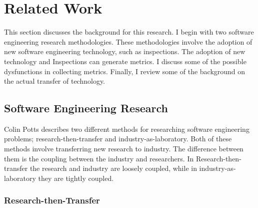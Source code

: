 \newpage
\section{Related Work}
\label{sec:related}

This section discusses the background for this research.  I begin with two
software engineering research methodologies.  These methodologies involve
the adoption of new software engineering technology, such as inspections.
The adoption of new technology and Inspections can generate metrics.  I
discuss some of the possible dysfunctions in collecting metrics.  Finally,
I review some of the background on the actual transfer of technology.

\subsection{Software Engineering Research}

Colin Potts describes two different methods for researching software
engineering problems; research-then-transfer and
industry-as-laboratory\cite{Potts93}.  Both of these methods involve
transferring new research to industry.  The difference between them is the
coupling between the industry and researchers.  In Research-then-transfer
the research and industry are loosely coupled, while in
industry-as-laboratory they are tightly coupled.

\subsubsection{Research-then-Transfer}

